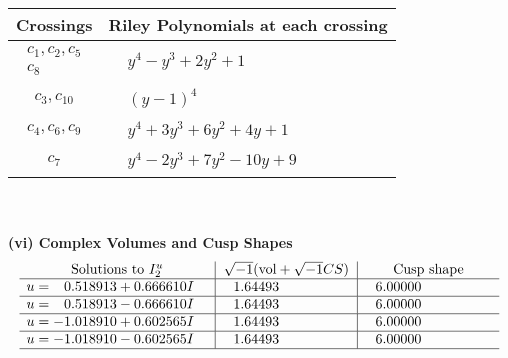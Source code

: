 \documentclass[1p]{elsarticle_modified}
\theoremstyle{definition}
\newcommand{\I}{\sqrt{-1}}
\begin{document}
\begin{tabular}{m{50pt}|m{274pt}}
Crossings & \hspace{64pt}Riley Polynomials at each crossing \\
\hline $$\begin{aligned}c_{1},c_{2},c_{5}\\c_{8}\end{aligned}$$&$\begin{aligned}
&y^4- y^3+2 y^2+1
\end{aligned}$\\
\hline $$\begin{aligned}c_{3},c_{10}\end{aligned}$$&$\begin{aligned}
&(y-1)^4
\end{aligned}$\\
\hline $$\begin{aligned}c_{4},c_{6},c_{9}\end{aligned}$$&$\begin{aligned}
&y^4+3 y^3+6 y^2+4 y+1
\end{aligned}$\\
\hline $$\begin{aligned}c_{7}\end{aligned}$$&$\begin{aligned}
&y^4-2 y^3+7 y^2-10 y+9
\end{aligned}$\\
\hline
\end{tabular}\\~\\
\newpage\flushleft \textbf{(vi) Complex Volumes and Cusp Shapes}
$$\begin{array}{c|c|c}  
\text{Solutions to }I^u_{2}& \I (\text{vol} + \sqrt{-1}CS) & \text{Cusp shape}\\
 \hline 
\begin{aligned}
u &= \phantom{-}0.518913 + 0.666610 I\end{aligned}
 & \phantom{-}1.64493\phantom{ +0.000000I} & \phantom{-}6.00000\phantom{ +0.000000I} \\ \hline\begin{aligned}
u &= \phantom{-}0.518913 - 0.666610 I\end{aligned}
 & \phantom{-}1.64493\phantom{ +0.000000I} & \phantom{-}6.00000\phantom{ +0.000000I} \\ \hline\begin{aligned}
u &= -1.018910 + 0.602565 I\end{aligned}
 & \phantom{-}1.64493\phantom{ +0.000000I} & \phantom{-}6.00000\phantom{ +0.000000I} \\ \hline\begin{aligned}
u &= -1.018910 - 0.602565 I\end{aligned}
 & \phantom{-}1.64493\phantom{ +0.000000I} & \phantom{-}6.00000\phantom{ +0.000000I}\\
 \hline 
 \end{array}$$\newpage\newpage\renewcommand{\arraystretch}{1}
\end{document}
